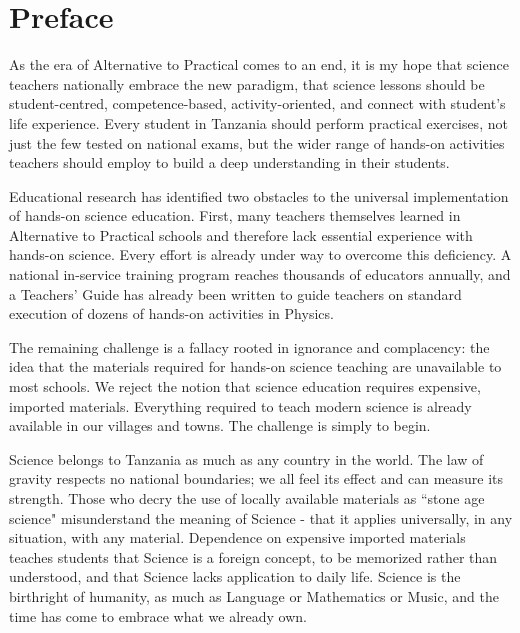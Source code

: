 \chapter*{Preface}

As the era of Alternative to Practical comes to an end, it is my hope that science teachers nationally embrace the new paradigm, that science lessons should be student-centred, competence-based, activity-oriented, and connect with student's life experience. Every student in Tanzania should perform practical exercises, not just the few tested on national exams, but the wider range of hands-on activities teachers should employ to build a deep understanding in their students.

Educational research has identified two obstacles to the universal implementation of hands-on science education. First, many teachers themselves learned in Alternative to Practical schools and therefore lack essential experience with hands-on science. Every effort is already under way to overcome this deficiency. A national in-service training program reaches thousands of educators annually, and a Teachers' Guide has already been written to guide teachers on standard execution of dozens of hands-on activities in Physics.

The remaining challenge is a fallacy rooted in ignorance and complacency: the idea that the materials required for hands-on science teaching are unavailable to most schools. We reject the notion that science education requires expensive, imported materials. Everything required to teach modern science is already available in our villages and towns. The challenge is simply to begin.

Science belongs to Tanzania as much as any country in the world. The law of gravity respects no national boundaries; we all feel its effect and can measure its strength. Those who decry the use of locally available materials as ``stone age science" misunderstand the meaning 
of Science - that it applies universally, in any situation, with any material. Dependence on expensive imported materials teaches students that Science is a foreign concept, to be memorized rather than understood, and that Science lacks application to daily life. Science is the birthright of humanity, as much as Language or Mathematics or Music, and the time has come to embrace what we already own.

